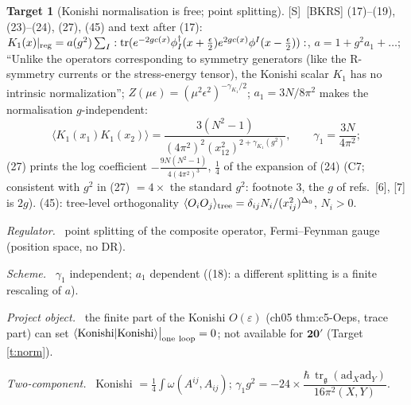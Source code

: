 \documentclass[11pt]{article}
\theoremstyle{definition}
\newtheorem{target}{Target}
\newcommand{\tr}{\operatorname{tr}}
\newcommand{\Sl}{\textup{[S]}}
\newcommand{\unit}{\dfrac{\hbar\,\tr_{\mathfrak g}(\mathrm{ad}_X\mathrm{ad}_Y)}{16\pi^2(X,Y)}}
\newcommand{\oneloop}{\big|_{\rm one\ loop}}
\newcommand{\fld}[1]{\par\textit{#1.}\ }
\begin{document}
\begin{target}[Konishi normalisation is free; point splitting]\label{t:bkrs}
\Sl\ [BKRS] (17)--(19), (23)--(24), (27), (45) and text after (17): $K_1(x)|_{\rm reg}=a(g^2)\sum_I:\tr(e^{-2gc(x)}\phi_I^\dagger(x+\tfrac\epsilon2)e^{2gc(x)}\phi^I(x-\tfrac\epsilon2)):$, $a=1+g^2a_1+\dots$; ``Unlike the operators corresponding to symmetry generators (like the R-symmetry currents or the stress-energy tensor), the Konishi scalar $K_1$ has no intrinsic normalization''; $Z(\mu\epsilon)=(\mu^2\epsilon^2)^{-\gamma_{K_1}/2}$; $a_1=3N/8\pi^2$ makes the normalisation $g$-independent:
\[
\langle K_1(x_1)K_1(x_2)\rangle=\frac{3(N^2-1)}{(4\pi^2)^2(x_{12}^2)^{2+\gamma_{K_1}(g^2)}},\qquad\gamma_1=\frac{3N}{4\pi^2};
\]
(27) prints the log coefficient $-\frac{9N(N^2-1)}{4(4\pi^2)^3}$, $\tfrac14$ of the expansion of (24) (C7; consistent with $g^2$ in (27) $=4\times$ the standard $g^2$: footnote 3, the $g$ of refs.~[6], [7] is $2g$). (45): tree-level orthogonality $\langle O_iO_j\rangle_{\rm tree}=\delta_{ij}N_i/(x_{ij}^2)^{\Delta_0}$, $N_i>0$.
\fld{Regulator} point splitting of the composite operator, Fermi--Feynman gauge (position space, no DR).
\fld{Scheme} $\gamma_1$ independent; $a_1$ dependent ((18): a different splitting is a finite rescaling of $a$).
\fld{Project object} the finite part of the Konishi $O(\varepsilon)$ (ch05 thm:c5-Oeps, trace part) can set $\langle\text{Konishi}|\text{Konishi}\rangle\oneloop=0$; not available for $\mathbf{20'}$ (Target \ref{t:norm}).
\fld{Two-component} Konishi $=\tfrac14\int\omega(A^{ij},A_{ij})$; $\gamma_1g^2=-24\times\unit$.
\end{target}
\end{document}
